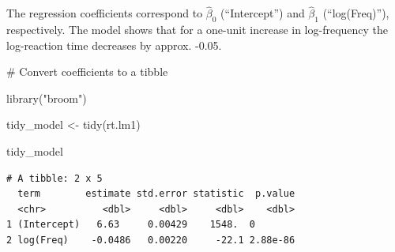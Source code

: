 \documentclass[
  11pt,
  letterpaper,
  DIV=11,
  numbers=noendperiod]{scrreprt}
\newenvironment{Shaded}{\begin{snugshade}}{\end{snugshade}}
\newcommand{\CommentTok}[1]{\textcolor[rgb]{0.37,0.37,0.37}{#1}}
\newcommand{\FunctionTok}[1]{\textcolor[rgb]{0.28,0.35,0.67}{#1}}
\newcommand{\NormalTok}[1]{\textcolor[rgb]{0.00,0.23,0.31}{#1}}
\newcommand{\OtherTok}[1]{\textcolor[rgb]{0.00,0.23,0.31}{#1}}
\newcommand{\StringTok}[1]{\textcolor[rgb]{0.13,0.47,0.30}{#1}}
\begin{document}
\begin{tcolorbox}[enhanced jigsaw, toprule=.15mm, opacitybacktitle=0.6, coltitle=black, arc=.35mm, colback=white, title=\textcolor{quarto-callout-tip-color}{\faLightbulb}\hspace{0.5em}{Coefficients}, titlerule=0mm, toptitle=1mm, bottomtitle=1mm, breakable, rightrule=.15mm, opacityback=0, bottomrule=.15mm, leftrule=.75mm, colframe=quarto-callout-tip-color-frame, left=2mm, colbacktitle=quarto-callout-tip-color!10!white]

The regression coefficients correspond to \(\hat{\beta}_0\)
(``Intercept'') and \(\hat{\beta}_1\) (``log(Freq)''), respectively. The
model shows that for a one-unit increase in log-frequency the
log-reaction time decreases by approx. -0.05.

\begin{Shaded}
\begin{Highlighting}[]
\CommentTok{\# Convert coefficients to a tibble }

\FunctionTok{library}\NormalTok{(}\StringTok{"broom"}\NormalTok{)}

\NormalTok{tidy\_model }\OtherTok{\textless{}{-}} \FunctionTok{tidy}\NormalTok{(rt.lm1)}

\NormalTok{tidy\_model}
\end{Highlighting}
\end{Shaded}

\begin{verbatim}
# A tibble: 2 x 5
  term        estimate std.error statistic  p.value
  <chr>          <dbl>     <dbl>     <dbl>    <dbl>
1 (Intercept)   6.63     0.00429    1548.  0       
2 log(Freq)    -0.0486   0.00220     -22.1 2.88e-86
\end{verbatim}

\end{tcolorbox}
\end{document}
